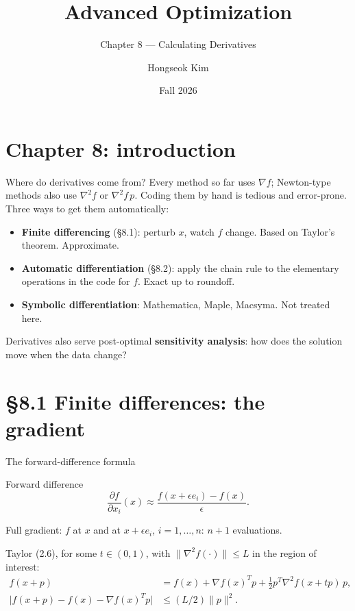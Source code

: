 \documentclass[12pt,aspectratio=169]{beamer}
\title{Advanced Optimization}
\subtitle{Chapter 8 --- Calculating Derivatives}
\author{Hongseok Kim}
\institute{Department of Electronic Engineering, Sogang University}
\date{Fall 2026}
\newcommand{\eps}{\epsilon}
\begin{document}
\section{Chapter 8: introduction}

\begin{frame}
  \titlepage
\end{frame}

\begin{frame}{Where do derivatives come from?}
  Every method so far uses $\nabla f$; Newton-type methods also use $\nabla^2 f$ or $\nabla^2 f\,p$.
  Coding them by hand is tedious and error-prone. Three ways to get them automatically:
  \begin{itemize}
    \item \textbf{Finite differencing} (\S8.1): perturb $x$, watch $f$ change. Based on Taylor's theorem. \alert{Approximate.}
    \item \textbf{Automatic differentiation} (\S8.2): apply the chain rule to the elementary operations in the code for $f$. \alert{Exact up to roundoff.}
    \item \textbf{Symbolic differentiation}: Mathematica, Maple, Macsyma. Not treated here.
  \end{itemize}
  Derivatives also serve post-optimal \textbf{sensitivity analysis}: how does the solution move when the data change?
\end{frame}

\section{\S8.1 Finite differences: the gradient}

\begin{frame}{The forward-difference formula}
  \begin{block}{Forward difference}
    \vspace{-1ex}
    \begin{equation}
      \frac{\partial f}{\partial x_i}(x) \approx \frac{f(x+\eps e_i)-f(x)}{\eps}. \tag{8.1}
    \end{equation}
  \end{block}
  Full gradient: $f$ at $x$ and at $x+\eps e_i$, $i=1,\dots,n$: \alert{$n+1$ evaluations.}

  Taylor (2.6), for some $t\in(0,1)$, with $\|\nabla^2 f(\cdot)\|\le L$ in the region of interest:
  \begin{align}
    f(x+p) &= f(x) + \nabla f(x)^T p + \tfrac12 p^T\nabla^2 f(x+tp)\,p, \tag{8.2}\\
    \bigl|f(x+p)-f(x)-\nabla f(x)^Tp\bigr| &\le (L/2)\|p\|^2. \tag{8.3}
  \end{align}
\end{frame}
\end{document}
